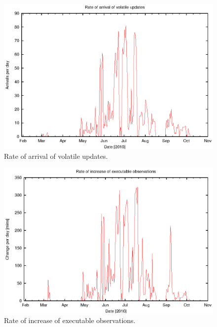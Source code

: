 \begin{figure}[htbp]
\begin{center}
    \includegraphics[scale=1.0, angle=0]{figures/volrate.eps}
\end{center}
\caption[Rate of arrival of volatile updates.]
{Rate of arrival of volatile updates.}
\label{fig:vol_rateplot}
\end{figure}

\begin{figure}[htbp]
\begin{center}
    \includegraphics[scale=1.0, angle=0]{figures/volexec.eps}
\end{center}
\caption[Rate of increase of executable observations.]
{Rate of increase of executable observations.}
\label{fig:vol_execplot}
\end{figure}

